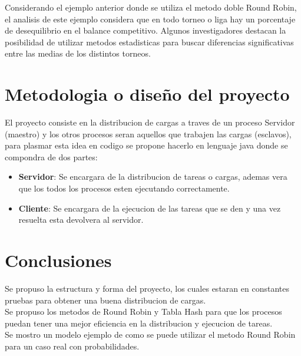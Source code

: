 \documentclass[conference,letterpaper]{IEEEtran}
\begin{document}
Considerando el ejemplo anterior donde se utiliza el metodo doble Round Robin, el analisis de este ejemplo considera que en todo torneo o liga hay un porcentaje de desequilibrio en el balance competitivo. Algunos investigadores destacan la posibilidad de utilizar metodos estadisticas para buscar diferencias significativas entre las medias de los distintos torneos.

\section{Metodologia o diseño del proyecto}
El proyecto consiste en la distribucion de cargas a traves de un proceso Servidor (maestro) y los otros procesos seran aquellos que  trabajen las cargas (esclavos), para plasmar esta idea en codigo se propone hacerlo en lenguaje java donde se compondra de dos partes:

\begin{itemize}
    \item \textbf{Servidor}: Se encargara de la distribucion de tareas o cargas, ademas vera que los todos los procesos esten ejecutando correctamente.
    \item \textbf{Cliente}: Se encargara de la ejecucion de las tareas que se den y una vez resuelta esta devolvera al servidor.
\end{itemize}


\section{Conclusiones}
Se propuso la estructura y forma del proyecto, los cuales estaran en constantes pruebas para obtener una buena distribucion de cargas.\\

Se propuso los metodos de Round Robin y Tabla Hash para que los procesos puedan tener una mejor eficiencia en la distribucion y ejecucion de tareas.\\

Se mostro un modelo ejemplo de como se puede utilizar el metodo Round Robin para un caso real con probabilidades.
\end{document}
